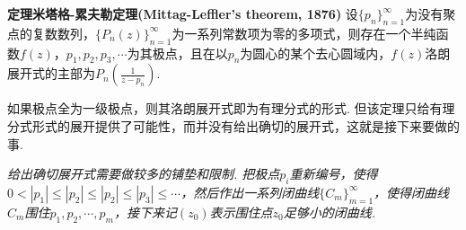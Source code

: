 \documentclass[UTF8]{ctexart}
\newenvironment{theorem}[1]
    {\begin{tcolorbox}[enhanced, colback=LightYellow, breakable=true, frame hidden, borderline west={1.5mm}{-2mm}{DarkBlue}]
    {\bfseries {\color{DarkBlue} 定理}\quad #1} \newline}
    {\end{tcolorbox}}
\begin{document}
\begin{theorem}{米塔格-累夫勒定理(Mittag-Leffler's theorem, 1876)}
    设\(\{p_n\}_{n=1}^{\infty}\)为没有聚点的复数数列，\(\{P_n(z)\}_{n=1}^{\infty}\)为一系列常数项为零的多项式，则存在一个半纯函数\(f(z)\)，\(p_1,p_2,p_3,\cdots\)为其极点，且在以\(p_n\)为圆心的某个去心圆域内，\(f(z)\)洛朗展开式的主部为\(\displaystyle{P_n\left(\frac{1}{z-p_n}\right)}\).
\end{theorem}

如果极点全为一级极点，则其洛朗展开式即为有理分式的形式. 但该定理只给有理分式形式的展开提供了可能性，而并没有给出确切的展开式，这就是接下来要做的事.

\vspace{1cm}

\textit{
给出确切展开式需要做较多的铺垫和限制. 把极点\(p_i\)重新编号，使得\(0<|p_1|\leq|p_2|\leq|p_2|\leq|p_3|\leq \cdots\)，然后作出一系列闭曲线\(\{C_m\}_{m=1}^{\infty}\)，使得闭曲线\(C_m\)围住\(p_1, p_2, \cdots, p_m\)，接下来记\((z_0)\)表示围住点\(z_0\)足够小的闭曲线.
}
\end{document}
